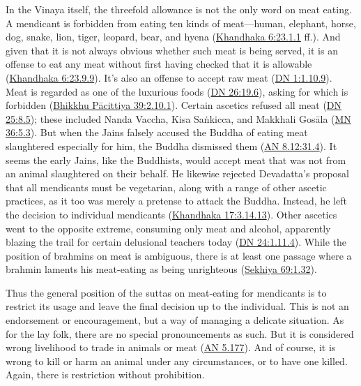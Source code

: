 \documentclass[12pt,openany]{book}%
\begin{document}
In the Vinaya itself, the threefold allowance is not the only word on meat eating. A mendicant is forbidden from eating ten kinds of meat—human, elephant, horse, dog, snake, lion, tiger, leopard, bear, and hyena (\href{https://suttacentral.net/pli{-}tv{-}kd6/en/brahmali\#23.1.1}{Khandhaka 6:23.1.1} ff.). And given that it is not always obvious whether such meat is being served, it is an offense to eat any meat without first having checked that it is allowable (\href{https://suttacentral.net/pli{-}tv{-}kd6/en/brahmali\#23.9.9}{Khandhaka 6:23.9.9}). It’s also an offense to accept raw meat (\href{https://suttacentral.net/dn1/en/sujato\#1.10.9}{DN 1:1.10.9}). Meat is regarded as one of the luxurious foods (\href{https://suttacentral.net/dn26/en/sujato\#19.6}{DN 26:19.6}), asking for which is forbidden (\href{https://suttacentral.net/pli{-}tv{-}bu{-}vb{-}pc39/en/brahmali\#2.10.1}{Bhikkhu Pācittiya 39:2.10.1}). Certain ascetics refused all meat (\href{https://suttacentral.net/dn25/en/sujato\#8.5}{DN 25:8.5}); these included Nanda Vaccha, Kisa \textsanskrit{Saṅkicca}, and Makkhali \textsanskrit{Gosāla} (\href{https://suttacentral.net/mn36/en/sujato\#5.3}{MN 36:5.3}). But when the Jains falsely accused the Buddha of eating meat slaughtered especially for him, the Buddha dismissed them (\href{https://suttacentral.net/an8.12/en/sujato\#31.4}{AN 8.12:31.4}). It seems the early Jains, like the Buddhists, would accept meat that was not from an animal slaughtered on their behalf. He likewise rejected Devadatta’s proposal that all mendicants must be vegetarian, along with a range of other ascetic practices, as it too was merely a pretense to attack the Buddha. Instead, he left the decision to individual mendicants (\href{https://suttacentral.net/pli{-}tv{-}kd17/en/brahmali\#3.14.13}{Khandhaka 17:3.14.13}). Other ascetics went to the opposite extreme, consuming only meat and alcohol, apparently blazing the trail for certain delusional teachers today (\href{https://suttacentral.net/dn24/en/sujato\#1.11.4}{DN 24:1.11.4}). While the position of brahmins on meat is ambiguous, there is at least one passage where a brahmin laments his meat-eating as being unrighteous (\href{https://suttacentral.net/pli{-}tv{-}bu{-}vb{-}sk69/en/brahmali\#1.32}{Sekhiya 69:1.32}).

Thus the general position of the suttas on meat-eating for mendicants is to restrict its usage and leave the final decision up to the individual. This is not an endorsement or encouragement, but a way of managing a delicate situation. As for the lay folk, there are no special pronouncements as such. But it is considered wrong livelihood to trade in animals or meat (\href{https://suttacentral.net/an5.177/en/sujato}{AN 5.177}). And of course, it is wrong to kill or harm an animal under any circumstances, or to have one killed. Again, there is restriction without prohibition.
\end{document}
